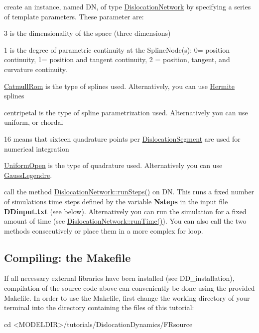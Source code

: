 \begin{DoxyItemize}
\item create an instance, named D\+N, of type \hyperlink{classmodel_1_1_dislocation_network}{Dislocation\+Network} by specifying a series of template parameters. These parameter are\+:
\begin{DoxyItemize}
\item 3 is the dimensionality of the space (three dimensions)
\item 1 is the degree of parametric continuity at the Spline\+Node(s)\+: 0= position continuity, 1= position and tangent continuity, 2 = position, tangent, and curvature continuity.
\item \hyperlink{classmodel_1_1_catmull_rom}{Catmull\+Rom} is the type of splines used. Alternatively, you can use \hyperlink{classmodel_1_1_hermite}{Hermite} splines
\item centripetal is the type of spline parametrization used. Alternatively you can use uniform, or chordal
\item 16 means that sixteen quadrature points per \hyperlink{classmodel_1_1_dislocation_segment}{Dislocation\+Segment} are used for numerical integration
\item \hyperlink{structmodel_1_1_uniform_open}{Uniform\+Open} is the type of quadrature used. Alternatively you can use \hyperlink{structmodel_1_1_gauss_legendre}{Gauss\+Legendre}.
\end{DoxyItemize}
\item call the method \hyperlink{classmodel_1_1_dislocation_network_a3f9d89b936222954861d3366d7b971dd}{Dislocation\+Network\+::run\+Steps()} on D\+N. This runs a fixed number of simulations time steps defined by the variable {\bfseries Nsteps} in the input file {\bfseries D\+Dinput.\+txt} (see below). Alternatively you can run the simulation for a fixed amount of time (see \hyperlink{classmodel_1_1_dislocation_network_aeac382c9e8b6df7737f9fa3d9fe46413}{Dislocation\+Network\+::run\+Time()}). You can also call the two methods consecutively or place them in a more complex for loop.
\end{DoxyItemize}\hypertarget{_p_i_chargedparticles_FRsource_makefile}{}\subsection{Compiling\+: the Makefile}\label{_p_i_chargedparticles_FRsource_makefile}
If all necessary external libraries have been installed (see D\+D\+\_\+installation), compilation of the source code above can conveniently be done using the provided Makefile. In order to use the Makefile, first change the working directory of your terminal into the directory containing the files of this tutorial\+: \begin{DoxyVerb}cd <MODELDIR>/tutorials/DislocationDynamics/FRsource
\end{DoxyVerb}


